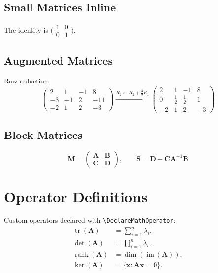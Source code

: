\documentclass[
    language=english,
    doctype=article,
    institution=none,
    titlestyle=book,
]{../../omnilatex}
\DeclareMathOperator{\tr}{tr}
\DeclareMathOperator{\rank}{rank}
\DeclareMathOperator{\im}{im}
\DeclareMathOperator{\ker}{ker}
\theoremstyle{plain}
\theoremstyle{definition}
\theoremstyle{remark}
\begin{document}
\subsection{Small Matrices Inline}

The identity is $\bigl(\begin{smallmatrix} 1 & 0 \\ 0 & 1 \end{smallmatrix}\bigr)$.

\subsection{Augmented Matrices}

Row reduction:
\[
    \left(\begin{array}{ccc|c}
        2 & 1 & -1 & 8 \\
        -3 & -1 & 2 & -11 \\
        -2 & 1 & 2 & -3
    \end{array}\right)
    \xrightarrow{R_2 \leftarrow R_2 + \frac{3}{2}R_1}
    \left(\begin{array}{ccc|c}
        2 & 1 & -1 & 8 \\
        0 & \frac{1}{2} & \frac{1}{2} & 1 \\
        -2 & 1 & 2 & -3
    \end{array}\right)
\]

\subsection{Block Matrices}

\[
    \mathbf{M} = \begin{pmatrix}
        \mathbf{A} & \mathbf{B} \\
        \mathbf{C} & \mathbf{D}
    \end{pmatrix}, \qquad
    \mathbf{S} = \mathbf{D} - \mathbf{C}\mathbf{A}^{-1}\mathbf{B}
\]

\section{Operator Definitions}
\label{sec:operators}

Custom operators declared with \verb|\DeclareMathOperator|:
\begin{align}
    \tr(\mathbf{A}) &= \sum_{i=1}^n \lambda_i, \label{eq:trace}\\
    \det(\mathbf{A}) &= \prod_{i=1}^n \lambda_i, \label{eq:determinant}\\
    \rank(\mathbf{A}) &= \dim(\im(\mathbf{A})), \label{eq:rank}\\
    \ker(\mathbf{A}) &= \{\mathbf{x} : \mathbf{A}\mathbf{x} = \mathbf{0}\}. \label{eq:kernel}
\end{align}
\end{document}
